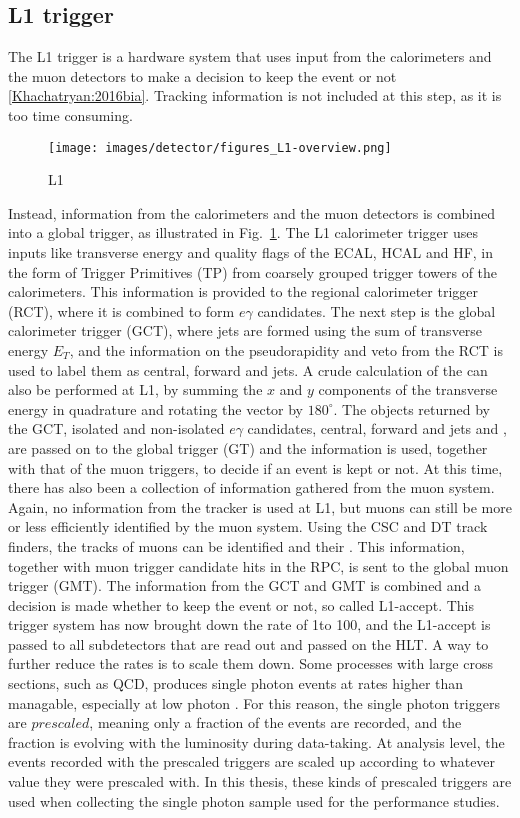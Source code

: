 \subsection{L1 trigger}
The L1 trigger is a hardware system that uses input from the calorimeters and the muon detectors to make a decision to keep the event or not \ref{Khachatryan:2016bia}. 
Tracking information is not included at this step, as it is too time consuming. 
\begin{figure}[!htp]
  \centering
   \texttt{[image: images/detector/figures\_L1-overview.png]}
   \caption{L1}
   \label{fig:L1}
\end{figure}                                                                           
Instead, information from the calorimeters and the muon detectors is combined into a global trigger, as illustrated in Fig.~\ref{fig:L1}. 
The L1 calorimeter trigger uses inputs like transverse energy and quality flags of the ECAL, HCAL and HF, in the form of Trigger Primitives (TP) from coarsely grouped trigger towers of the calorimeters.
This information is provided to the regional calorimeter trigger (RCT), where it is combined to form $e\gamma$ candidates. 
The next step is the global calorimeter trigger (GCT), where jets are formed using the sum of transverse energy $E_{T}$, and the information on the pseudorapidity and \Tau veto from the RCT is used to label them as central, forward and \Tau jets. 
A crude calculation of the \ptmiss can also be performed at L1, by summing the $x$ and $y$ components of the transverse energy in quadrature and rotating the vector by $180^{\circ}$. 
The objects returned by the GCT, isolated and non-isolated $e\gamma$ candidates, central, forward and \Tau jets and \ptmiss, are passed on to the global trigger (GT) and the information is used, together with that of the muon triggers, to decide if an event is kept or not.   
At this time, there has also been a collection of information gathered from the muon system. 
Again, no information from the tracker is used at L1, but muons can still be more or less efficiently identified by the muon system. 
Using the CSC and DT track finders, the tracks of muons can be identified and their \pt. 
This information, together with muon trigger candidate hits in the RPC, is sent to the global muon trigger (GMT). 
The information from the GCT and GMT is combined and a decision is made whether to keep the event or not, so called L1-accept. 
This trigger system has now brought down the rate of 1\GHz to 100\kHz, and the L1-accept is passed to all subdetectors that are read out and passed on the HLT.
A way to further reduce the rates is to scale them down. 
Some processes with large cross sections, such as QCD, produces single photon events at rates higher than managable, especially at low photon \pt. 
For this reason, the single photon triggers are $prescaled$, meaning only a fraction of the events are recorded, and the fraction is evolving with the luminosity during data-taking. 
At analysis level, the events recorded with the prescaled triggers are scaled up according to whatever value they were prescaled with. 
In this thesis, these kinds of prescaled triggers are used when collecting the single photon sample used for the \ptmiss performance studies.  
